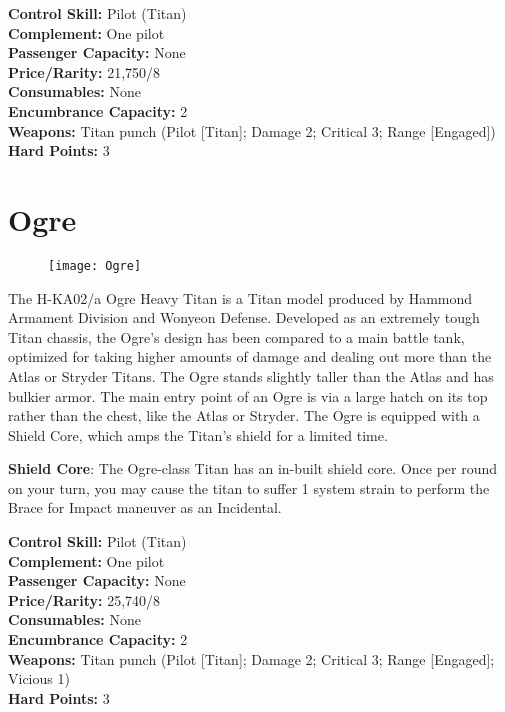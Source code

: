 
\begin{multicols}{2}
\noindent\textbf{Control Skill:} Pilot (Titan)\\
\noindent\textbf{Complement:} One pilot\\
\noindent\textbf{Passenger Capacity:} None\\
\noindent\textbf{Price/Rarity:} 21,750/8\\
\noindent\textbf{Consumables:} None\\
\noindent\textbf{Encumbrance Capacity:} 2\\
\noindent\textbf{Weapons:} Titan punch (Pilot [Titan]; Damage 2; Critical 3; Range [Engaged])\\
\noindent\textbf{Hard Points:} 3
\end{multicols}

\vspace*{\fill}
\pagebreak

\section{Ogre}
\label{sec:ogre}
\begin{wrapfigure}[12]{r}{.34\linewidth}
\vspace*{-2em}
\texttt{[image: Ogre]}
\end{wrapfigure}

The H-KA02/a Ogre Heavy Titan is a Titan model produced by Hammond Armament Division and Wonyeon Defense. Developed as an extremely tough Titan chassis, the Ogre's design has been compared to a main battle tank, optimized for taking higher amounts of damage and dealing out more than the Atlas or Stryder Titans. The Ogre stands slightly taller than the Atlas and has bulkier armor. The main entry point of an Ogre is via a large hatch on its top rather than the chest, like the Atlas or Stryder. The Ogre is equipped with a Shield Core, which amps the Titan's shield for a limited time.

\textbf{Shield Core}: The Ogre-class Titan has an in-built shield core. Once per round on your turn, you may cause the titan to suffer 1 system strain to perform the Brace for Impact maneuver as an Incidental.\\[3em]



\begin{multicols}{2}
\noindent\textbf{Control Skill:} Pilot (Titan)\\
\noindent\textbf{Complement:} One pilot\\
\noindent\textbf{Passenger Capacity:} None\\
\noindent\textbf{Price/Rarity:} 25,740/8\\
\noindent\textbf{Consumables:} None\\
\noindent\textbf{Encumbrance Capacity:} 2\\
\noindent\textbf{Weapons:} Titan punch (Pilot [Titan]; Damage 2; Critical 3; Range [Engaged]; Vicious 1)\\
\noindent\textbf{Hard Points:} 3
\end{multicols}



